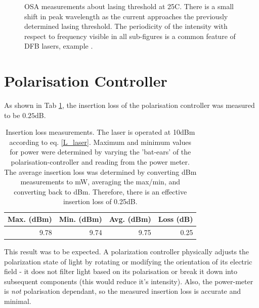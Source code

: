 \documentclass[12pt,a4paper]{report}
\begin{document}
\begin{figure}
    \caption{OSA measurements about lasing threshold at 25\degree{}C. There is a small shift in peak wavelength as the current approaches the previously determined lasing threshold. The periodicity of the intensity with respect to frequency visible in all sub-figures is a common feature of DFB lasers, example \cite{laser1}.}
    \label{OSA-current}
    \vspace{-12pt}
\end{figure}

\section{Polarisation Controller}
As shown in Tab \ref{PC-loss}, the insertion loss of the polarisation controller was measured to be $0.25$dB.

\begin{table}[htbp]
  \centering
  \label{tab:sample-table}
  \begin{tabular}{rrrr}
\toprule
   \textbf{Max. (dBm)} &   \textbf{Min. (dBm)} &   \textbf{Avg. (dBm)} &   \textbf{Loss (dB)} \\
\midrule
                  9.78 &                  9.74 &                  9.75 &                  0.25 \\
\bottomrule
\end{tabular}
  \caption{Insertion loss measurements. The laser is operated at 10dBm according to eq. \ref{L_laser}. Maximum and minimum values for power were determined by varying the 'bat-ears' of the polarisation-controller and reading from the power meter. The average insertion loss was determined by converting dBm measurements to mW, averaging the max/min, and converting back to dBm. Therefore, there is an effective insertion loss of 0.25dB.}
    \label{PC-loss}
\end{table}
This result was to be expected. A polarization controller physically adjusts the polarization state of light by rotating or modifying the orientation of its electric field - it does not filter light based on its polarisation or break it down into subsequent components (this would reduce it's intensity). Also, the power-meter is \textit{not} polarisation dependant, so the measured insertion loss is accurate and minimal.
\end{document}
